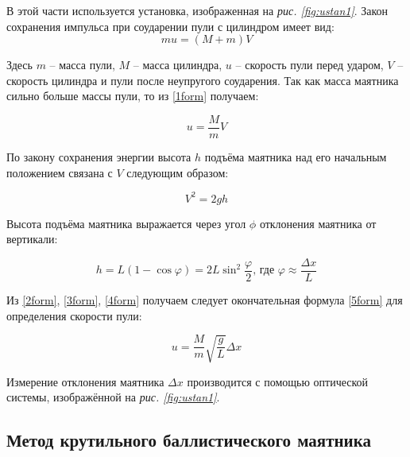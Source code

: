 \documentclass[a4paper,12pt]{article} %
\begin{document}
В этой части используется установка, изображенная на \textit{рис.  \ref{fig:ustan1}}. Закон сохранения импульса при соударении пули с цилиндром имеет вид:
\begin{equation}\label{1form}
mu = (M + m)V
\end{equation}

Здесь $m$ -- масса пули, $M$ -- масса цилиндра, $u$ -- скорость пули перед ударом, $V$ -- скорость цилиндра и пули после неупругого соударения. Так как масса маятника сильно больше массы пули, то из \eqref{1form} получаем:

\begin{equation}\label{2form}
u = \frac{M}{m}V
\end{equation}

По закону сохранения энергии высота $h$ подъёма маятника над его начальным положением связана с $V$ следующим образом:

\begin{equation}\label{3form}
V^2 = 2gh
\end{equation}

Высота подъёма маятника выражается через угол $\phi$ отклонения маятника от вертикали:

\begin{equation}\label{4form}
h = L(1 - \cos\varphi) = 2L \sin^2{\frac{\varphi}{2}} \text{, где } \varphi \approx \frac{\Delta x}{L}
\end{equation}

Из \eqref{2form}, \eqref{3form}, \eqref{4form} получаем следует окончательная формула \eqref{5form} для определения скорости пули:

\begin{equation}\label{5form}
u = \frac{M}{m} \sqrt{\frac{g}{L}} \Delta x
\end{equation}

Измерение отклонения маятника $\Delta x$ производится с помощью оптической системы, изображённой на \textit{рис.  \ref{fig:ustan1}}.


\subsection{Метод крутильного баллистического маятника}
\label{p2-2}
\end{document}
